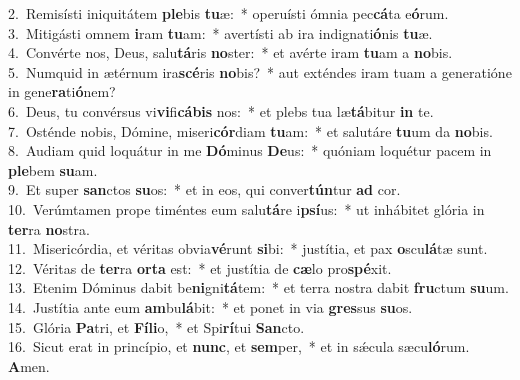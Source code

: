 {2.~}Remisísti iniquitátem \textbf{ple}bis \textbf{tu}æ:~* operuísti ómnia pec\textbf{cá}ta e\textbf{ó}rum.\\
{3.~}Mitigásti omnem \textbf{i}ram \textbf{tu}am:~* avertísti ab ira indignati\textbf{ó}nis \textbf{tu}æ.\\
{4.~}Convérte nos, Deus, salu\textbf{tá}ris \textbf{no}ster:~* et avérte iram \textbf{tu}am a \textbf{no}bis.\\
{5.~}Numquid in ætérnum ira\textbf{scé}ris \textbf{no}bis?~* aut exténdes iram tuam a generatióne in gene\textbf{ra}ti\textbf{ó}nem?\\
{6.~}Deus, tu convérsus vi\textbf{vi}fi\textbf{cá}\textbf{bis} nos:~* et plebs tua læ\textbf{tá}bitur \textbf{in} te.\\
{7.~}Osténde nobis, Dómine, miseri\textbf{cór}diam \textbf{tu}am:~* et salutáre \textbf{tu}um da \textbf{no}bis.\\
{8.~}Audiam quid loquátur in me \textbf{Dó}minus \textbf{De}us:~* quóniam loquétur pacem in \textbf{ple}bem \textbf{su}am.\\
{9.~}Et super \textbf{san}ctos \textbf{su}os:~* et in eos, qui conver\textbf{tún}tur \textbf{ad} cor.\\
{10.~}Verúmtamen prope timéntes eum salu\textbf{tá}re i\textbf{psí}us:~* ut inhábitet glória in \textbf{ter}ra \textbf{no}stra.\\
{11.~}Misericórdia, et véritas obvia\textbf{vé}runt \textbf{si}bi:~* justítia, et pax \textbf{o}scu\textbf{lá}tæ sunt.\\
{12.~}Véritas de \textbf{ter}ra \textbf{or}\textbf{ta} est:~* et justítia de \textbf{cæ}lo pro\textbf{spé}xit.\\
{13.~}Etenim Dóminus dabit be\textbf{ni}gni\textbf{tá}tem:~* et terra nostra dabit \textbf{fru}ctum \textbf{su}um.\\
{14.~}Justítia ante eum \textbf{am}bu\textbf{lá}bit:~* et ponet in via \textbf{gres}sus \textbf{su}os.\\
{15.~}Glória \textbf{Pa}tri, et \textbf{Fí}\textbf{li}o,~* et Spi\textbf{rí}tui \textbf{San}cto.\\
{16.~}Sicut erat in princípio, et \textbf{nunc}, et \textbf{sem}per,~* et in sǽcula sæcu\textbf{ló}rum. \textbf{A}men.\\
